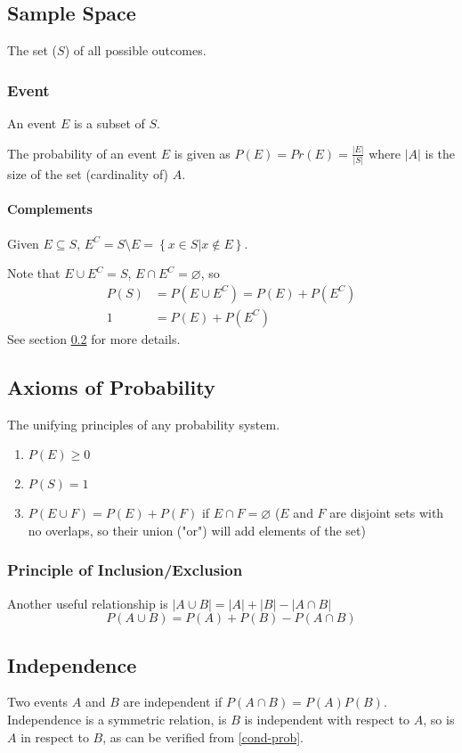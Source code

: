 \documentclass{article}
\begin{document}
\subsection{Sample Space}
The set ($S$) of all possible outcomes.
\subsubsection{Event} An event $E$ is a subset of $S$.

The probability of an event $E$ is given as $P(E)=Pr(E)=\frac{|E|}{|S|}$ where $|A|$ is the size of the set (cardinality of) $A$.

\paragraph{Complements}
Given $E \subseteq S$, $E^C= S \setminus E = \left\{x \in S | x \notin E\right\}$.

Note that $E \cup E^C = S$, $E \cap E^C = \varnothing$, so
\begin{align*}
    P(S) &= P(E \cup E^C) = P(E) + P(E^C) \\
    1 &= P(E) + P(E^C)
\end{align*}
See section \ref{prob-ax} for more details.

\subsection{Axioms of Probability}\label{prob-ax}
The unifying principles of any probability system.

\begin{enumerate}
    \item $P(E)\ge0$
    \item $P(S)=1$
    \item $P(E \cup F) = P(E) + P(F)$ if $E \cap F = \varnothing$ ($E$ and $F$ are disjoint sets with no overlaps, so their union ("or") will add elements of the set)
\end{enumerate}

\subsubsection{Principle of Inclusion/Exclusion}
Another useful relationship is
$|A \cup B| = |A| + |B| - |A \cap B|$
$$P(A \cup B) = P(A) + P(B) - P(A \cap B)$$

\subsection{Independence}
Two events $A$ and $B$ are independent if $P(A \cap B) = P(A)P(B)$.
Independence is a symmetric relation, is $B$ is independent with respect to $A$, so is $A$ in respect to $B$, as can be verified from \ref{cond-prob}.
\end{document}
